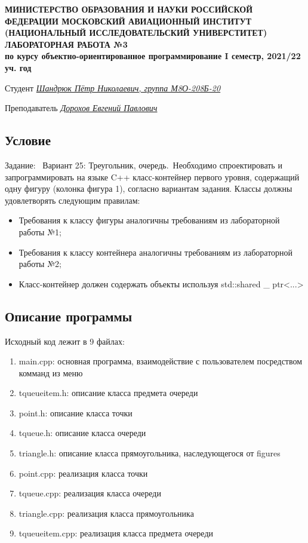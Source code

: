 \documentclass[12pt]{article}
\begin{document}
\begin{titlepage}
\begin{center}
\textbf{МИНИСТЕРСТВО ОБРАЗОВАНИЯ И НАУКИ РОССИЙСКОЙ ФЕДЕРАЦИИ
\medskip
МОСКОВСКИЙ АВИАЦИОННЫЙ ИНСТИТУТ
(НАЦИОНАЛЬНЫЙ ИССЛЕДОВАТЕЛЬСКИЙ УНИВЕРСТИТЕТ)
\vfill\vfill
{\Huge ЛАБОРАТОРНАЯ РАБОТА №3} \\
по курсу объектно-ориентированное программирование
I семестр, 2021/22 уч. год}
\end{center}
\vfill

Студент \uline{\it {Шандрюк Пётр Николаевич, группа М8О-208Б-20}\hfill}

Преподаватель \uline{\it {Дорохов Евгений Павлович}\hfill}

\vfill
\end{titlepage}

\subsection*{Условие}

Задание: \
Вариант 25: Треугольник, очередь.\
Необходимо спроектировать и запрограммировать на языке C++ класс-контейнер первого
уровня, содержащий одну фигуру (колонка фигура 1), согласно вариантам задания. Классы
должны удовлетворять следующим правилам:
\begin{itemize}
	\item Требования к классу фигуры аналогичны требованиям из лабораторной работы №1;
	\item Требования к классу контейнера аналогичны требованиям из лабораторной работы №2;
	\item Класс-контейнер должен содержать объекты используя std::shared \_ ptr<...>
\end{itemize}


\subsection*{Описание программы}

Исходный код лежит в 9 файлах:
\begin{enumerate}
\item main.cpp: основная программа, взаимодействие с пользователем посредством комманд из меню

\item tqueueitem.h:    описание класса предмета очереди
\item point.h:     описание класса точки
\item tqueue.h:  описание класса очереди
\item triangle.h: описание класса прямоугольника, наследующегося от figures
\item point.cpp:     реализация класса точки
\item tqueue.cpp:  реализация класса очереди
\item triangle.cpp: реализация класса прямоугольника
\item tqueueitem.cpp:    реализация класса предмета очереди

\end{enumerate}
\end{document}

